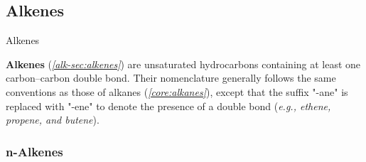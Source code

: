 \documentclass[10pt]{article}
\begin{document}
  \subsection{Alkenes}

    \begin{core}{Alkenes}

      \textbf{Alkenes} (\textit{\autoref{alk-sec:alkenes}}) are unsaturated hydrocarbons containing at least one carbon--carbon double bond. Their nomenclature generally follows the same conventions as those of alkanes (\textit{\autoref{core:alkanes}}), except that the suffix "-ane" is replaced with "-ene" to denote the presence of a double bond (\textit{e.g., ethene, propene, and butene}).

    \end{core}

    \subsubsection{n-Alkenes}
\end{document}
